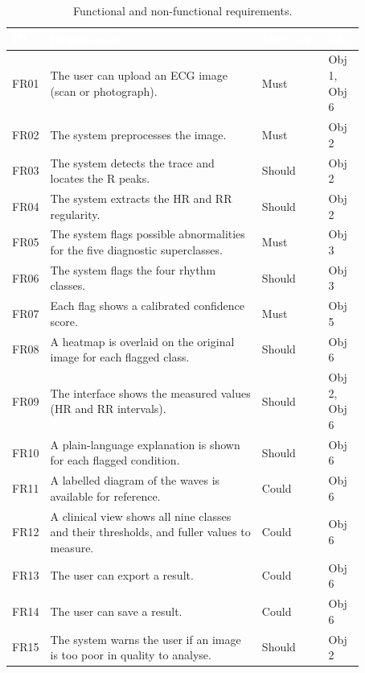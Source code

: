 \begin{table}[!htbp]
  \centering
  \footnotesize
  \setlength{\arrayrulewidth}{0.8pt}      %
  \renewcommand{\arraystretch}{1.05}      %
  \caption{Functional and non-functional requirements.}
  \label{tab:functional-req}
  \begin{tabular}{|p{0.08\linewidth}|p{0.60\linewidth}|p{0.105\linewidth}|p{0.085\linewidth}|}
    \hline
    \rowcolor{cyan!90!black}
    \textcolor{white}{\textbf{ID}} & \textcolor{white}{\textbf{Requirement}} &
    \textcolor{white}{\textbf{MoSCoW}} & \textcolor{white}{\textbf{Obj.}} \\
    \hline
    FR01 & The user can upload an ECG image (scan or photograph). & Must & Obj 1, Obj 6 \\
    \hline
    FR02 & The system preprocesses the image. & Must & Obj 2 \\
    \hline
    FR03 & The system detects the trace and locates the R peaks. & Should & Obj 2 \\
    \hline
    FR04 & The system extracts the HR and RR regularity. & Should & Obj 2 \\
    \hline
    FR05 & The system flags possible abnormalities for the five diagnostic superclasses. & Must & Obj 3 \\
    \hline
    FR06 & The system flags the four rhythm classes. & Should & Obj 3 \\
    \hline
    FR07 & Each flag shows a calibrated confidence score. & Must & Obj 5 \\
    \hline
    FR08 & A heatmap is overlaid on the original image for each flagged class. & Should & Obj 6 \\
    \hline
    FR09 & The interface shows the measured values (HR and RR intervals). & Should & Obj 2, Obj 6 \\
    \hline
    FR10 & A plain-language explanation is shown for each flagged condition. & Should & Obj 6 \\
    \hline
    FR11 & A labelled diagram of the waves is available for reference. & Could & Obj 6 \\
    \hline
    FR12 & A clinical view shows all nine classes and their thresholds, and fuller values to measure. & Could & Obj 6 \\
    \hline
    FR13 & The user can export a result. & Could & Obj 6 \\
    \hline
    FR14 & The user can save a result. & Could & Obj 6 \\
    \hline
    FR15 & The system warns the user if an image is too poor in quality to analyse. & Should & Obj 2 \\

\end{tabular}
\end{table}
